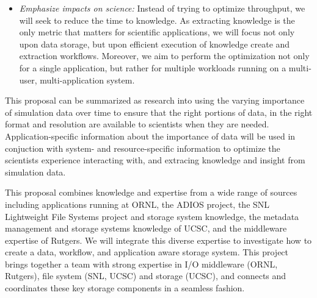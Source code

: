 \begin{itemize}
\item
{\em Emphasize impacts on science:}
Instead of trying to optimize throughput, we will seek to reduce the time to knowledge.
As extracting knowledge is the only metric that matters for scientific applications, we will
focus not only upon data storage, but upon efficient execution of knowledge create and extraction
workflows.
Moreover, we aim to perform the optimization not only for a single
application, but rather for multiple workloads running on a multi-user, multi-application
system.
\end{itemize}

This proposal can be summarized as research into using the varying importance of simulation data over time to
ensure that the right portions of data, in the right format and resolution are available to scientists when they are needed.
Application-specific information about the importance of data will be used in conjuction with system- and resource-specific information
to optimize the scientists experience interacting with, and extracing knowledge and insight from simulation data.


This proposal combines knowledge and expertise 
from a wide range of sources including applications running at ORNL, the ADIOS project,
the SNL Lightweight File Systems project and storage system knowledge, the metadata
management and storage systems knowledge of UCSC, and the middleware expertise
of Rutgers. We will integrate this diverse expertise to investigate how to create
a data, workflow, and application aware storage system.
This project brings together a team with strong expertise in I/O middleware (ORNL, Rutgers),
file system (SNL, UCSC) and storage (UCSC), and connects and
coordinates these key storage components in a seamless fashion.

